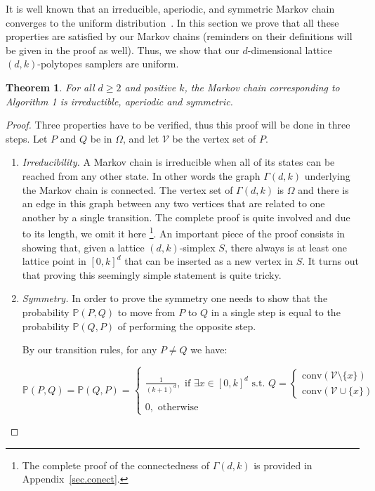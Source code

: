 \documentclass[a4paper]{article}
\newtheorem{theorem}{Theorem}
\begin{document}
It is well known that an irreducible, aperiodic, and symmetric Markov chain converges to the uniform distribution~\cite{levin2009markov}. In this section we prove that all these properties are satisfied by our Markov chains (reminders on their definitions will be given in the proof as well). Thus, we show that our $d$-dimensional lattice $(d,k)$-polytopes samplers are uniform.

\begin{theorem}\label{Thm.MC}
  For all $d\geq2$ and positive $k$, the Markov chain corresponding to Algorithm 1 is irreductible, aperiodic and symmetric.
\end{theorem}

\begin{proof}
  Three properties have to be verified, thus this proof will be done in three steps. Let $P$ and $Q$ be in $\Omega$, and let $\mathcal{V}$ be the vertex set of $P$.

  \begin{enumerate}[i]
    \item \textit{Irreducibility.}
    A Markov chain is irreducible when all of its states can be reached from any other state. In other words the graph $\Gamma(d,k)$ underlying the Markov chain is connected. The vertex set of $\Gamma(d, k)$ is $\Omega$ and there is an edge in this graph between any two vertices that are related to one another by a single transition. The complete proof is quite involved and due to its length, we omit it here \footnote{The complete proof of the connectedness of $\Gamma(d,k)$ is provided in Appendix~\ref{sec.conect}.}. An important piece of the proof consists in showing that, given a lattice $(d,k)$-simplex $S$, there always is at least one lattice point in $[0,k]^d$ that can be inserted as a new vertex in $S$. It turns out that proving this seemingly simple statement is quite tricky.

    \item \textit{Symmetry.}
    In order to prove the symmetry one needs to show that the probability $\mathbb{P}(P,Q)$ to move from $P$ to $Q$ in a single step is equal to the probability $\mathbb{P}(Q,P)$ of performing the opposite step.

    By our transition rules, for any $P \neq Q$ we have:

    $$
      \mathbb{P}(P,Q)=\mathbb{P}(Q,P) =
      \begin{cases}
        \frac{1}{(k+1)^d}, \text{ if } \exists x \in [0,k]^d \text{ s.t. } Q=
          \begin{cases}
            \mathrm{conv}(\mathcal{V}\mathord{\setminus}\{x\})\\
            \mathrm{conv}(\mathcal{V}\cup\{x\})
          \end{cases}
        \\
        0, \text{ otherwise }
      \end{cases}
    $$


\end{enumerate}
\end{proof}
\end{document}

